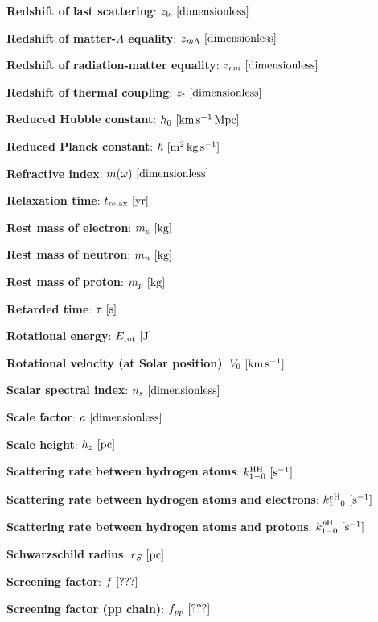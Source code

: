 \documentclass[a4paper,10pt]{article}
\begin{document}
{\noindent}\textbf{Redshift of last scattering}: $z_\mathrm{ls} ~ [{\rm dimensionless}]$

{\noindent}\textbf{Redshift of matter-$\Lambda$ equality}: $z_{m\Lambda} ~ [{\rm dimensionless}]$

{\noindent}\textbf{Redshift of radiation-matter equality}: $z_{rm} ~ [{\rm dimensionless}]$

{\noindent}\textbf{Redshift of thermal coupling}: $z_t ~ [{\rm dimensionless}]$

{\noindent}\textbf{Reduced Hubble constant}: $h_0 ~ [{\rm km\,s^{-1}\,Mpc}]$

{\noindent}\textbf{Reduced Planck constant}: $\hbar ~ [{\rm m^2\,kg\,s^{-1}}]$

{\noindent}\textbf{Refractive index}: $m(\omega) ~ [{\rm dimensionless}]$

{\noindent}\textbf{Relaxation time}: $t_\mathrm{relax} ~ [{\rm yr}]$

{\noindent}\textbf{Rest mass of electron}: $m_e ~ [{\rm kg}]$

{\noindent}\textbf{Rest mass of neutron}: $m_n ~ [{\rm kg}]$

{\noindent}\textbf{Rest mass of proton}: $m_p ~ [{\rm kg}]$

{\noindent}\textbf{Retarded time}: $\tau ~ [{\rm s}]$

{\noindent}\textbf{Rotational energy}: $E_{\rm rot} ~ [{\rm J}]$

{\noindent}\textbf{Rotational velocity (at Solar position)}: $V_0 ~ [{\rm km\,s^{-1}}]$

{\noindent}\textbf{Scalar spectral index}: $n_s ~ [{\rm dimensionless}]$

{\noindent}\textbf{Scale factor}: $a ~ [{\rm dimensionless}]$

{\noindent}\textbf{Scale height}: $h_z ~ [{\rm pc}]$

{\noindent}\textbf{Scattering rate between hydrogen atoms}: $k_{1-0}^\mathrm{HH} ~ [{\rm s^{-1}}]$

{\noindent}\textbf{Scattering rate between hydrogen atoms and electrons}: $k_{1-0}^{e\mathrm{H}} ~ [{\rm s^{-1}}]$

{\noindent}\textbf{Scattering rate between hydrogen atoms and protons}: $k_{1-0}^{p\mathrm{H}} ~ [{\rm s^{-1}}]$

{\noindent}\textbf{Schwarzschild radius}: $r_S ~ [{\rm pc}]$

{\noindent}\textbf{Screening factor}: $f ~ [{\rm ???}]$

{\noindent}\textbf{Screening factor (pp chain)}: $f_{pp} ~ [{\rm ???}]$
\end{document}
